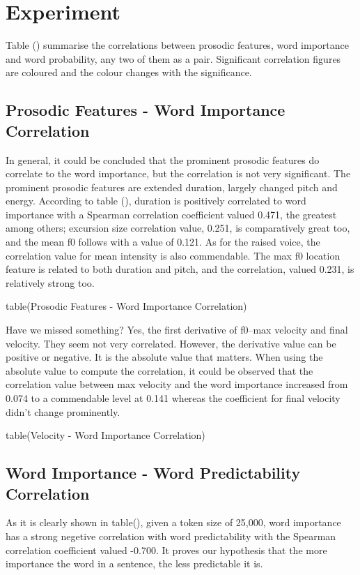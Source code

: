 \chapter{Experiment}

Table () summarise the correlations between prosodic features, word importance and word probability, any two of them as a pair. Significant correlation figures are coloured and the colour changes with the significance. 

\section{Prosodic Features - Word Importance Correlation}

In general, it could be concluded that the prominent prosodic features do correlate to the word importance, but the correlation is not very significant. The prominent prosodic features are extended duration, largely changed pitch and energy. According to table (), duration is positively correlated to word importance with a Spearman correlation coefficient valued 0.471, the greatest among others; excursion size correlation value, 0.251,  is comparatively great too, and the mean f0 follows with a value of 0.121. As for the raised voice, the correlation value for mean intensity is also commendable. The max f0 location feature is related to both duration and pitch, and the correlation, valued 0.231, is relatively strong too.

table(Prosodic Features - Word Importance Correlation)

Have we missed something? Yes, the first derivative of f0--max velocity and final velocity. They seem not very correlated. However, the derivative value can be positive or negative. It is the absolute value that matters. When using the absolute value to compute the correlation, it could be observed that the correlation value between max velocity and the word importance increased from 0.074 to a commendable level at 0.141 whereas the coefficient for final velocity didn't change prominently.

table(Velocity - Word Importance Correlation)

\section{Word Importance - Word Predictability Correlation}
As it is clearly shown in table(), given a token size of 25,000, word importance has a strong negetive correlation with word predictability with the Spearman correlation coefficient valued -0.700. It proves our hypothesis that the more importance the word in a sentence, the less predictable it is. 

